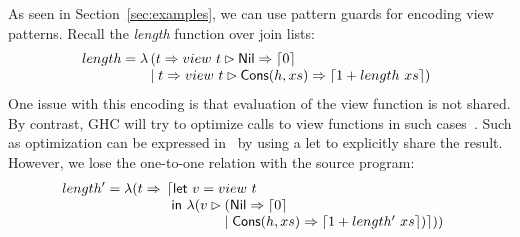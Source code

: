 As seen in Section~\ref{sec:examples}, we can use pattern guards for
encoding view patterns. Recall 
the \textit{length} function over join lists:
\[
  length = \lambda \!\!\begin{array}[t]{l}
                     (t \Rightarrow view~t \rhd 
      \textsf{Nil} \Rightarrow \left\lceil 0\right\rceil \\
      \mid t \Rightarrow view~t \rhd \textsf{Cons}(h,xs) \Rightarrow \left\lceil 1+length~ xs\right\rceil)
    \end{array} 
\]
One issue with this encoding is that evaluation of the view function is not shared.
By contrast, GHC will try to optimize calls to view functions in
such cases~\cite{ghc_guide_view_patterns}.
Such as optimization can be expressed in \lambdaPMC\ by using a let to explicitly share the result.
However, we lose the one-to-one relation with the source program:
\[
  length' = \lambda (t \Rightarrow\!\! \begin{array}[t]{l}
                                    \lceil \textsf{let}~ v = view~t \\
  ~\textsf{in}~ \lambda (v \rhd
  \!\!\!\begin{array}[t]{l}
    (\textsf{Nil} \Rightarrow \left\lceil 0\right\rceil  \\
    \mid \textsf{Cons}(h,xs) \Rightarrow \left\lceil 1+length'~ xs\right\rceil) \rceil))
  \end{array}
                                  \end{array}
\]

    

